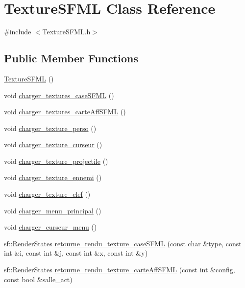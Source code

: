 \hypertarget{classTextureSFML}{}\section{Texture\+S\+F\+ML Class Reference}
\label{classTextureSFML}


{\ttfamily \#include $<$Texture\+S\+F\+M\+L.\+h$>$}

\subsection*{Public Member Functions}
\begin{DoxyCompactItemize}
\item 
\hyperlink{classTextureSFML_af140d180a2ab08c7c8eda5b38f3fb653}{Texture\+S\+F\+ML} ()
\item 
void \hyperlink{classTextureSFML_a0e4fcc15c683b6dc2edb4fdfa04c9b74}{charger\+\_\+textures\+\_\+case\+S\+F\+ML} ()
\item 
void \hyperlink{classTextureSFML_ac9a80a9ca433817596a40c0a250d298d}{charger\+\_\+textures\+\_\+carte\+Aff\+S\+F\+ML} ()
\item 
void \hyperlink{classTextureSFML_af90a280cc0da676e3888edb5e0863911}{charger\+\_\+texture\+\_\+perso} ()
\item 
void \hyperlink{classTextureSFML_a7f5271af1e129ecb4e17ceee400802cc}{charger\+\_\+texture\+\_\+curseur} ()
\item 
void \hyperlink{classTextureSFML_a90b73459f6df531bcce7c2bc11456734}{charger\+\_\+texture\+\_\+projectile} ()
\item 
void \hyperlink{classTextureSFML_ab0c2381533c90bee25963cdb77a3b0f9}{charger\+\_\+texture\+\_\+ennemi} ()
\item 
void \hyperlink{classTextureSFML_afe8aa91ce9e56a13a024db437738b062}{charger\+\_\+texture\+\_\+clef} ()
\item 
void \hyperlink{classTextureSFML_a9f49f9dbc376deb39f782e1d0836e37e}{charger\+\_\+menu\+\_\+principal} ()
\item 
void \hyperlink{classTextureSFML_a969055bb787e82794db6b341cf945786}{charger\+\_\+curseur\+\_\+menu} ()
\item 
sf\+::\+Render\+States \hyperlink{classTextureSFML_aa53677d04e938b2aab93706f4e418510}{retourne\+\_\+rendu\+\_\+texture\+\_\+case\+S\+F\+ML} (const char \&type, const int \&i, const int \&j, const int \&x, const int \&y)
\item 
sf\+::\+Render\+States \hyperlink{classTextureSFML_ad7b34fb7ef06ae789c2b608c3d2e73eb}{retourne\+\_\+rendu\+\_\+texture\+\_\+carte\+Aff\+S\+F\+ML} (const int \&config, const bool \&salle\+\_\+act)

\end{DoxyCompactItemize}
